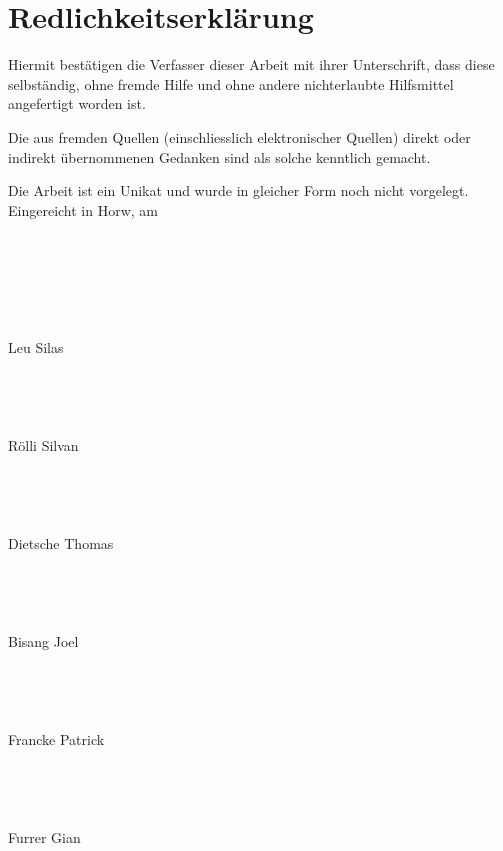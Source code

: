 \documentclass[../main.tex]{subfiles}
\begin{document}
\newpage
\section*{Redlichkeitserklärung}
\thispagestyle{empty}

 
Hiermit bestätigen die Verfasser dieser Arbeit mit ihrer Unterschrift, dass diese selbständig, ohne fremde Hilfe und ohne andere nichterlaubte Hilfsmittel angefertigt worden ist. 

 

Die aus fremden Quellen (einschliesslich elektronischer Quellen) direkt oder indirekt übernommenen Gedanken sind als solche kenntlich gemacht. 

 

Die Arbeit ist ein Unikat und wurde in gleicher Form noch nicht vorgelegt.\\

 

Eingereicht in Horw, am \docdate
\\
\\
\\
\\
\\
\\
\\
Leu Silas
\\
\\
\\
\\
\\
Rölli Silvan
\\
\\
\\
\\
\\
Dietsche Thomas
\\
\\
\\
\\
\\
Bisang Joel
\\
\\
\\
\\
\\
Francke Patrick
\\
\\
\\
\\
\\
Furrer Gian
\end{document}
